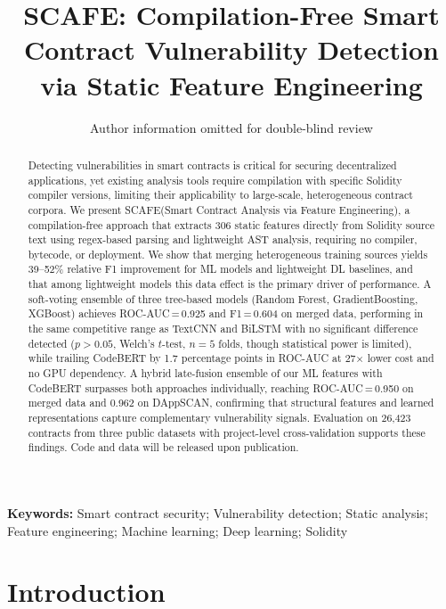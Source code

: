 \documentclass[11pt,a4paper]{article}
\newcommand{\MethodName}{SCAFE\xspace}
\begin{document}
\title{\MethodName: Compilation-Free Smart Contract Vulnerability Detection via Static Feature Engineering}
\author{Author information omitted for double-blind review}
\date{}
\maketitle

\begin{abstract}
\noindent Detecting vulnerabilities in smart contracts is critical for securing decentralized applications, yet existing analysis tools require compilation with specific Solidity compiler versions, limiting their applicability to large-scale, heterogeneous contract corpora.
We present \MethodName (Smart Contract Analysis via Feature Engineering), a compilation-free approach that extracts 306 static features directly from Solidity source text using regex-based parsing and lightweight AST analysis, requiring no compiler, bytecode, or deployment.
We show that merging heterogeneous training sources yields 39--52\% relative F1 improvement for ML models and lightweight DL baselines, and that among lightweight models this data effect is the primary driver of performance.
A soft-voting ensemble of three tree-based models (Random Forest, GradientBoosting, XGBoost) achieves ROC-AUC\,=\,0.925 and F1\,=\,0.604 on merged data, performing in the same competitive range as TextCNN and BiLSTM with no significant difference detected ($p > 0.05$, Welch's $t$-test, $n = 5$ folds, though statistical power is limited), while trailing CodeBERT by 1.7 percentage points in ROC-AUC at 27$\times$ lower cost and no GPU dependency.
A hybrid late-fusion ensemble of our ML features with CodeBERT surpasses both approaches individually, reaching ROC-AUC\,=\,0.950 on merged data and 0.962 on DAppSCAN, confirming that structural features and learned representations capture complementary vulnerability signals.
Evaluation on 26,423 contracts from three public datasets with project-level cross-validation supports these findings.
Code and data will be released upon publication.
\end{abstract}

\medskip
\noindent\textbf{Keywords:} Smart contract security; Vulnerability detection; Static analysis; Feature engineering; Machine learning; Deep learning; Solidity

\section{Introduction}
\label{sec:intro}
\end{document}
